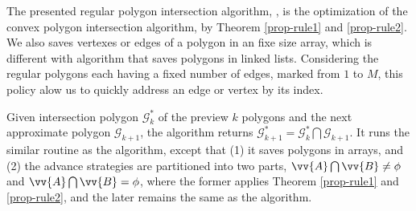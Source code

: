 The presented regular polygon intersection algorithm, \ie \rpia, is the optimization of the convex polygon intersection algorithm, by Theorem \ref{prop-rule1} and \ref{prop-rule2}. We also saves vertexes or edges of a polygon in an fixe size array, which is different with algorithm \cpia  that saves polygons in linked lists.
Considering the regular polygons each having a fixed number of edges, marked from $1$ to $M$, this policy alow us to quickly address an edge or vertex by its index.

Given intersection polygon $\mathcal{G}^*_k$ of the preview $k$ polygons and the next approximate polygon $\mathcal{G}_{k+1}$, the algorithm \rpia returns $\mathcal{G}^*_{k+1} = \mathcal{G}^*_k  \bigcap \mathcal{G}_{k+1}$.
It runs the similar routine as the \cpia algorithm, except that (1) it saves polygons in arrays, and (2) the advance strategies are partitioned into two parts, \ie $\vv{A} \bigcap \vv{B} \ne \phi$ and $\vv{A} \bigcap \vv{B} = \phi$, where the former applies Theorem \ref{prop-rule1} and \ref{prop-rule2}, and the later remains the same as the \cpia algorithm.





